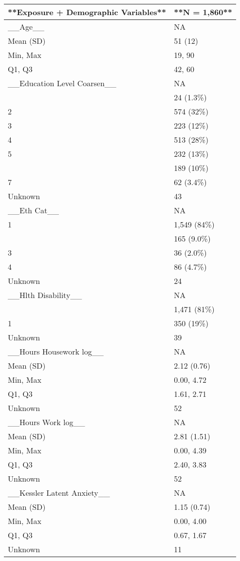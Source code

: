 \documentclass[
  singlecolumn]{article}
\begin{document}
\newpage{}

\begin{tabular}[t]{ll}
\toprule
**Exposure + Demographic Variables** & **N = 1,860**\\
\midrule
\_\_Age\_\_ & NA\\
Mean (SD) & 51 (12)\\
Min, Max & 19, 90\\
Q1, Q3 & 42, 60\\
\_\_Education Level Coarsen\_\_ & NA\\
\addlinespace
1 & 24 (1.3\%)\\
2 & 574 (32\%)\\
3 & 223 (12\%)\\
4 & 513 (28\%)\\
5 & 232 (13\%)\\
\addlinespace
6 & 189 (10\%)\\
7 & 62 (3.4\%)\\
Unknown & 43\\
\_\_Eth Cat\_\_ & NA\\
1 & 1,549 (84\%)\\
\addlinespace
2 & 165 (9.0\%)\\
3 & 36 (2.0\%)\\
4 & 86 (4.7\%)\\
Unknown & 24\\
\_\_Hlth Disability\_\_ & NA\\
\addlinespace
0 & 1,471 (81\%)\\
1 & 350 (19\%)\\
Unknown & 39\\
\_\_Hours Housework log\_\_ & NA\\
Mean (SD) & 2.12 (0.76)\\
\addlinespace
Min, Max & 0.00, 4.72\\
Q1, Q3 & 1.61, 2.71\\
Unknown & 52\\
\_\_Hours Work log\_\_ & NA\\
Mean (SD) & 2.81 (1.51)\\
\addlinespace
Min, Max & 0.00, 4.39\\
Q1, Q3 & 2.40, 3.83\\
Unknown & 52\\
\_\_Kessler Latent Anxiety\_\_ & NA\\
Mean (SD) & 1.15 (0.74)\\
\addlinespace
Min, Max & 0.00, 4.00\\
Q1, Q3 & 0.67, 1.67\\
Unknown & 11\\

\end{tabular}
\end{document}

